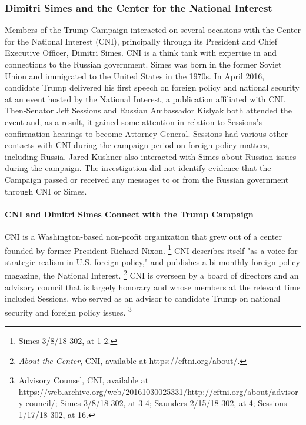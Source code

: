 \subsubsection{Dimitri Simes and the Center for the National Interest}

Members of the Trump Campaign interacted on several occasions with the Center for the National Interest (CNI), principally through its President and Chief Executive Officer, Dimitri Simes.
CNI is a think tank with expertise in and connections to the Russian government.
Simes was born in the former Soviet Union and immigrated to the United States in the 1970s.
In April 2016, candidate Trump delivered his first speech on foreign policy and national security at an event hosted by the National Interest, a publication affiliated with CNI.
Then-Senator Jeff Sessions and Russian Ambassador Kislyak both attended the event and, as a result, it gained some attention in relation to Sessions's confirmation hearings to become Attorney General.
Sessions had various other contacts with CNI during the campaign period on foreign-policy matters, including Russia.
Jared Kushner also interacted with Simes about Russian issues during the campaign.
The investigation did not identify evidence that the Campaign passed or received any messages to or from the Russian government through CNI or Simes.

\paragraph{CNI and Dimitri Simes Connect with the Trump Campaign}

CNI is a Washington-based non-profit organization that grew out of a center founded by former President Richard Nixon.%
\footnote{Simes 3/8/18 302, at 1-2.}
CNI describes itself "as a voice for strategic realism in U.S. foreign policy," and publishes a bi-monthly foreign policy magazine, the National Interest.%
\footnote{\textit{About the Center}, CNI, available at https://cftni.org/about/.}
CNI is overseen by a board of directors and an advisory council that is largely honorary and whose members at the relevant time included Sessions, who served as an advisor to candidate Trump on national security and foreign policy issues.%
\footnote{Advisory Counsel, CNI, available at
https://web.archive.org/web/20161030025331/http://cftni.org/about/advisory-council/;
Simes 3/8/18 302, at 3-4;
Saunders 2/15/18 302, at 4;
Sessions 1/17/18 302, at 16.}

